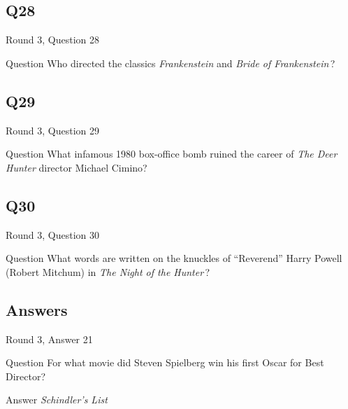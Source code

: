 \documentclass[11pt]{beamer}
\begin{document}
\subsection*{Q28}
\begin{frame}[t]{Round 3, Question 28}
\vspace{2em}
\begin{block}{Question}
Who directed the classics \emph{Frankenstein} and \emph{Bride of Frankenstein}\,?
\end{block}
\end{frame}
    

\subsection*{Q29}
\begin{frame}[t]{Round 3, Question 29}
\vspace{2em}
\begin{block}{Question}
What infamous 1980 box-office bomb ruined the career of \emph{The Deer Hunter} director Michael Cimino?
\end{block}
\end{frame}
    

\subsection*{Q30}
\begin{frame}[t]{Round 3, Question 30}
\vspace{2em}
\begin{block}{Question}
What words are written on the knuckles of ``Reverend'' Harry Powell (Robert Mitchum) in \emph{The Night of the Hunter}\,?
\end{block}
\end{frame}
    
\subsection{Answers}

\begin{frame}[t]{Round 3, Answer 21}
\vspace{2em}
\begin{block}{Question}
For what movie did Steven Spielberg win his first Oscar for Best Director?
\end{block}
\pause{}
\begin{block}{Answer}
\emph{Schindler's List}
\end{block}
\end{frame}
    
\end{document}
